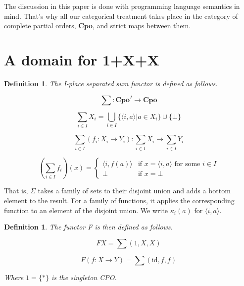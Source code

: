 \documentclass[a4paper]{article}
\newcommand{\arr}{\rightarrow}
\newtheorem{defNplaceSeparatedSum}[defNuF]{Definition}
\newtheorem{defF}[defNuF]{Definition}
\begin{document}
The discussion in this paper is done with programming language semantics in
mind.  That's why all our categorical treatment takes place in the category of
complete partial orders, $\mathbf{Cpo}$, and strict maps between them.

\section{A domain for 1+X+X}

\begin{defNplaceSeparatedSum}

The I-place separated sum functor is defined as follows.

\begin{equation}
\sum : \mathbf{Cpo}^I \arr \mathbf{Cpo} \nonumber
\end{equation}

\begin{equation}
\sum_{i \in I}{X_i} =
  \bigcup_{i \in I} \{ \langle i, a \rangle | a \in X_i \}
  \cup \{ \bot \} \nonumber
\end{equation}

\begin{equation}
\sum_{i \in I}{(f_i : X_i \arr Y_i)} :
  \sum_{i \in I}{X_i} \arr \sum_{i \in I}{Y_i} \nonumber
\end{equation}

\begin{equation*}
( \sum_{i \in I}f_i ) (x) = \left\{
  \begin{array}{rl}
     \langle i, f(a) \rangle & \text{if } x = \langle i, a \rangle
                               \text{ for some } i \in I \\
    \bot                     & \text{if } x = \bot
  \end{array} \right.
\end{equation*}

\end{defNplaceSeparatedSum}

That is, $\Sigma$ takes a family of sets to their disjoint union and adds a bottom
element to the result.  For a family of functions, it applies the corresponding
function to an element of the disjoint union.  We write $\kappa_i(a)$ for
$\langle i, a \rangle$.

\begin{defF}

The functor F is then defined as follows.

\begin{equation*}
FX = \sum{(1, X, X)}
\end{equation*}

\begin{equation*}
F(f : X \arr Y) = \sum{(\text{id}, f, f)}
\end{equation*}

Where $1 = \{*\}$ is the singleton CPO.

\end{defF}
\end{document}
